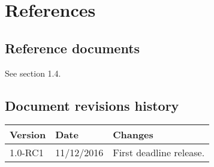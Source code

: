 \section{References}


\subsection{Reference documents}
See section 1.4.



\subsection{Document revisions history}
\begin{tabular}{| l | l | p{10cm} |}
\hline
\textbf{Version} & \textbf{Date} & \textbf{Changes}\\
\hline
1.0-RC1 & 11/12/2016 & First deadline release.\\
\hline
\end{tabular} 